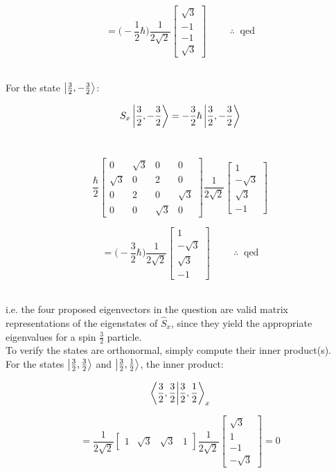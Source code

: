 \documentclass[9pt]{extarticle}
\begin{document}
\begin{multicols*}{2}
$$
= \bigg( -\frac 12 \hbar \bigg) \frac{1}{2\sqrt 2}
\begin{bmatrix}
        \sqrt 3 \\
        -1 \\
        -1 \\
        \sqrt 3
\end{bmatrix}
\hspace{1cm} \therefore \;\; \text{qed}
$$ \ 

For the state $\ket{\frac 32, -\frac 32}$:

$$S_x \ket{\frac 32, -\frac 32} = -\frac 32 \hbar \ket{\frac 32, -\frac 32}$$ \ 

$$
\frac \hbar 2
\begin{bmatrix}
        0 & \sqrt 3 & 0 & 0 \\
        \sqrt 3 & 0 & 2 & 0 \\
        0 & 2 & 0 & \sqrt 3 \\
        0 & 0 & \sqrt 3 & 0
\end{bmatrix}
\frac{1}{2\sqrt 2}
\begin{bmatrix}
        1 \\
        -\sqrt 3 \\
        \sqrt 3 \\
        -1
\end{bmatrix}
$$ 

$$
= \bigg( -\frac 32 \hbar \bigg) \frac{1}{2\sqrt 2}
\begin{bmatrix}
        1 \\
        -\sqrt 3 \\
        \sqrt 3 \\
        -1
\end{bmatrix}
\hspace{1cm} \therefore \;\; \text{qed}
$$ \ 

i.e. the four proposed eigenvectors in the question are valid matrix representations of the eigenstates of $\hat S_x$, since they yield the appropriate eigenvalues for a spin $\frac 32$ particle. \\ 

To verify the states are orthonormal, simply compute their inner product(s). \\ 

For the states $\ket{\frac 32, \frac 32}$ and $\ket{\frac 32, \frac 12}$, the inner product:

$$\bra{\frac 32, \frac 32}\ket{\frac 32, \frac 12}_x$$

$$
= \frac{1}{2\sqrt 2}
\begin{bmatrix}
	1 & \sqrt 3 & \sqrt 3 & 1
\end{bmatrix}
\frac{1}{2\sqrt 2}
\begin{bmatrix}
        \sqrt 3 \\
        1 \\
        -1 \\
        -\sqrt 3
\end{bmatrix}
= 0
$$ \ 


\end{multicols*}
\end{document}
